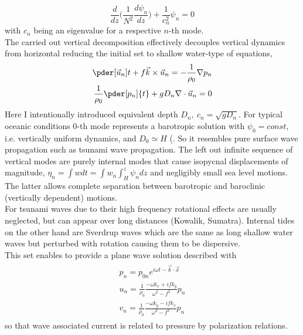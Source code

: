 \begin{equation}
\frac{d}{dz}\big( \frac{1}{N^2} \frac{d \psi_n}{dz} \big) + \frac{1}{c^2_n}\psi_n = 0
\end{equation}
with $c_n$ being an eigenvalue for a respective $n$-th mode.\\
The carried out vertical decomposition effectively decouples vertical dynamics from horizontal reducing the initial set to shallow water-type of equations,
\begin{align}
\pder[\vec{u}_n]{t} + f \vec{k} \times \vec{u}_n = -\frac{1}{\rho_0} \nabla p_n\\
\frac{1}{\rho_0} \pder[p_n]{t} + g D_n \nabla  \cdot \vec{u}_n = 0
\end{align}
Here I intentionally introduced equivalent depth $D_n,~c_n = \sqrt{g D_n}$. For typical oceanic conditions $0$-th mode represents a barotropic solution with $\psi_0 = const$, i.e.  vertically uniform dynamics, and $D_0 \simeq H$ (\cite{hendershott1981long}. So it resembles pure surface wave propagation such as tsunami wave propagation. The left out infinite sequence of vertical modes are purely internal modes that cause isopycnal displacements of magnitude, $\eta_n = \int w dt = \int w_n \int_H^z \psi_n dz$ and negligibly small sea level motions. The latter allows complete separation between barotropic and baroclinic (vertically dependent) motions.\\
For tsunami waves due to their high frequency rotational effects are usually neglected, but can appear over long distances (Kowalik, Sumatra). Internal tides on the other hand are Sverdrup waves which are the same as long shallow water waves but perturbed with rotation causing them to be dispersive.\\
This set enables to provide a plane wave solution described with
\begin{align}
\label{In:svw}
\begin{split}
p_n = p_{0n} e^{i \omega t - \vec{k} \cdot \vec{x}}\\
u_n = \frac{1}{\rho_0} \frac{-\omega k_x + i f k_y}{\omega^2 - f^2} p_n\\
v_n = \frac{1}{\rho_0} \frac{-\omega k_y - i f k_x}{\omega^2 - f^2} p_n
\end{split}
\end{align}
so that wave associated current is related to pressure by polarization relations.\\
